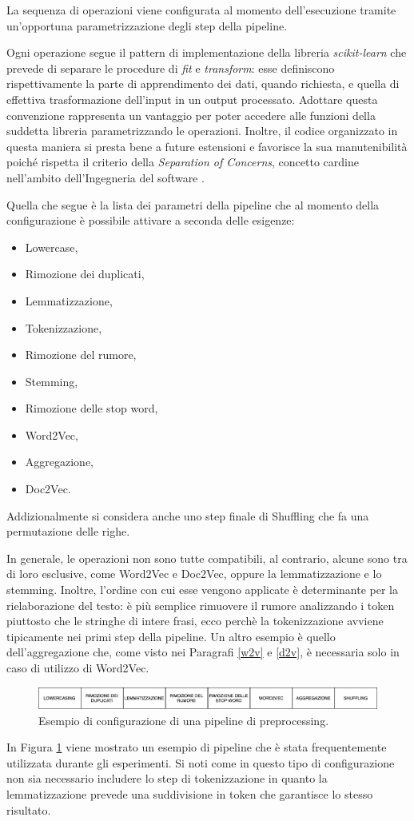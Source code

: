 \documentclass[12pt]{report}
\theoremstyle{definition}
\begin{document}
La sequenza di operazioni viene configurata al momento dell'esecuzione tramite un'opportuna parametrizzazione degli step della pipeline.

Ogni operazione segue il pattern di implementazione della libreria \textit{scikit-learn} che prevede di separare le procedure di \textit{fit} e \textit{transform}: esse definiscono rispettivamente la parte di apprendimento dei dati, quando richiesta, e quella di effettiva trasformazione dell'input in un output processato.
Adottare questa convenzione rappresenta un vantaggio per poter accedere alle funzioni della suddetta libreria parametrizzando le operazioni.
Inoltre, il codice organizzato in questa maniera si presta bene a future estensioni e favorisce la sua manutenibilità poiché rispetta il criterio della \textit{Separation of Concerns}, concetto cardine nell'ambito dell'Ingegneria del software \cite{32}.

Quella che segue è la lista dei parametri della pipeline che al momento della configurazione è possibile attivare a seconda delle esigenze:
\begin{itemize}
    \item Lowercase,
    \item Rimozione dei duplicati,
    \item Lemmatizzazione,
    \item Tokenizzazione,
    \item Rimozione del rumore,
    \item Stemming,
    \item Rimozione delle stop word,
    \item Word2Vec,
    \item Aggregazione,
    \item Doc2Vec.
\end{itemize}
Addizionalmente si considera anche uno step finale di Shuffling che fa una permutazione delle righe.

In generale, le operazioni non sono tutte compatibili, al contrario, alcune sono tra di loro esclusive, come Word2Vec e Doc2Vec, oppure la lemmatizzazione e lo stemming.
Inoltre, l'ordine con cui esse vengono applicate è determinante per la rielaborazione del testo: è più semplice rimuovere il rumore analizzando i token piuttosto che le stringhe di intere frasi, ecco perchè la tokenizzazione avviene tipicamente nei primi step della pipeline. Un altro esempio è quello dell'aggregazione che, come visto nei Paragrafi \ref{w2v} e \ref{d2v}, è necessaria solo in caso di utilizzo di Word2Vec.
\begin{figure}
    \centering
    \includegraphics[scale=0.45]{images/pipeline.png}
    \caption{Esempio di configurazione di una pipeline di preprocessing.}
    \label{pipeline}
\end{figure}
In Figura \ref{pipeline} viene mostrato un esempio di pipeline che è stata frequentemente utilizzata durante gli esperimenti. Si noti come in questo tipo di configurazione non sia necessario includere lo step di tokenizzazione in quanto la lemmatizzazione prevede una suddivisione in token che garantisce lo stesso risultato.
\end{document}

